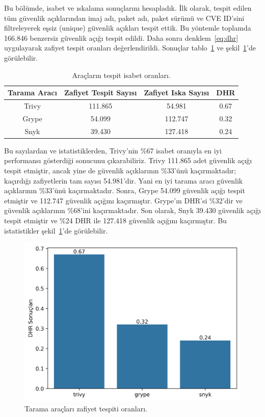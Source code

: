 Bu bölümde, isabet ve ıskalama sonuçlarını hesapladık. İlk olarak, tespit edilen tüm güvenlik açıklarından imaj adı, paket adı, paket sürümü ve CVE ID'sini filtreleyerek eşsiz (unique) güvenlik açıkları tespit ettik. Bu yöntemle toplamda 166.846 benzersiz güvenlik açığı tespit edildi. Daha sonra denklem~\ref{eq:dhr} uygulayarak zafiyet tespit oranları değerlendirildi. Sonuçlar tablo~\ref{tab:hit-and-miss} ve şekil~\ref{fig:hit-and-miss}'de görülebilir.

\begin{table}
    \centering
    \begin{tabular}{ |c|c|c|c| }
        \hline
        Tarama Aracı & Zafiyet Tespit Sayısı & Zafiyet Iska Sayısı & DHR \\
        \hline
        Trivy & 111.865 &  54.981 & 0.67 \\
        Grype &  54.099 & 112.747 & 0.32 \\
        Snyk  &  39.430 & 127.418 & 0.24 \\
        \hline
    \end{tabular}
    \caption{Araçların tespit isabet oranları.}\label{tab:hit-and-miss}
\end{table}

Bu sayılardan ve istatistiklerden, Trivy'nin \%67 isabet oranıyla en iyi performansı gösterdiği sonucunu çıkarabiliriz. Trivy 111.865 adet güvenlik açığı tespit etmiştir, ancak yine de güvenlik açıklarının \%33'ünü kaçırmaktadır; kaçırdığı zafiyetlerin tam sayısı 54.981'dir. Yani en iyi tarama aracı güvenlik açıklarının \%33'ünü kaçırmaktadır. Sonra, Grype 54.099 güvenlik açığı tespit etmiştir ve 112.747 güvenlik açığını kaçırmıştır. Grype'ın DHR'si \%32'dir ve güvenlik açıklarının \%68'ini kaçırmaktadır. Son olarak, Snyk 39.430 güvenlik açığı tespit etmiştir ve \%24 DHR ile 127.418 güvenlik açığını kaçırmıştır. Bu istatistikler şekil~\ref{fig:hit-and-miss}'de görülebilir.

\begin{figure}
    \centering
    \includegraphics[width=1\linewidth]{images/s1/DHR.png}
    \caption{Tarama araçları zafiyet tespiti oranları.}\label{fig:hit-and-miss}
\end{figure}

